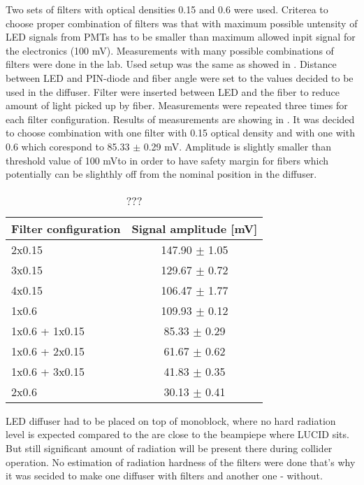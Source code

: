 Two sets of filters with optical densities 0.15 and 0.6 were used. Criterea to choose proper combination of filters was that 
with maximum possible untensity of LED signals from PMTs has to be smaller than maximum allowed inpit signal for the electronics (100 mV).
Measurements with many possible combinations of filters were done in the lab.
Used setup was the same as showed in . Distance between LED and PIN-diode and fiber angle were set to the values 
decided to be used in the diffuser. Filter were inserted between LED and the fiber to reduce amount of light picked up by fiber.
Measurements were repeated three times for each filter configuration. Results of measurements are showing in .
It was decided to choose combination with one filter with 0.15 optical density and with one with 0.6 which corespond to 85.33 $\pm$ 0.29 mV.
Amplitude is slightly smaller than threshold value of 100 mVto in order to have safety margin for fibers 
which potentially can be slighthly off from the nominal position in the diffuser.


\begin{table}[bp]
  \begin{tabular}{l|c}
    Filter configuration & Signal amplitude [mV]\\
    \hline
    2x0.15       	&	147.90	$\pm$	1.05	\\
    3x0.15       	&	129.67	$\pm$	0.72	\\
    4x0.15       	&	106.47	$\pm$	1.77	\\
    1x0.6          	&	109.93	$\pm$	0.12	\\
    1x0.6 + 1x0.15 	&	85.33	$\pm$	0.29	\\
    1x0.6 + 2x0.15 	&	61.67	$\pm$	0.62	\\
    1x0.6 + 3x0.15 	&	41.83	$\pm$	0.35	\\
    2x0.6	        &	30.13	$\pm$	0.41	\\
  \end{tabular}
  \caption{???}
  \label{tab:FilterChoice}
\end{table}

LED diffuser had to be placed on top of monoblock, where no hard radiation level is expected compared to the are close to the beampiepe where LUCID sits.
But still significant amount of radiation will be present there during collider operation.
No estimation of radiation hardness of the filters were done that's why it was secided to make one diffuser with filters and another one - without.

